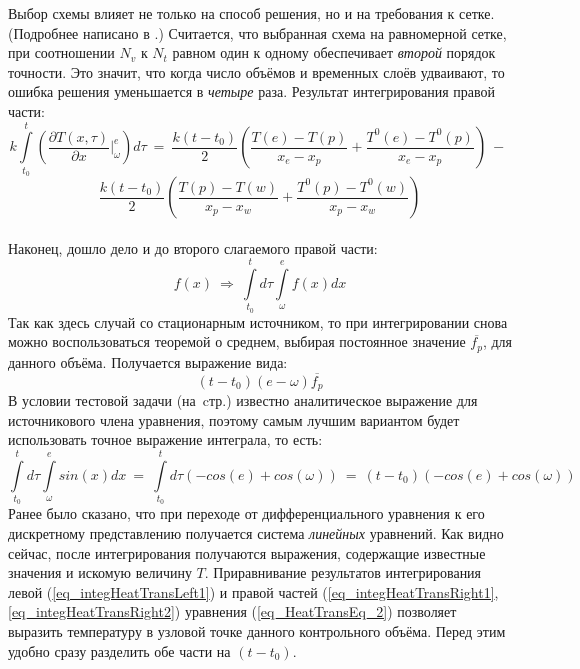 \documentclass[oneside, final, 14pt]{report}
\begin{document}
Выбор схемы влияет не только на способ решения, но и на требования к сетке. (Подробнее написано в \cite{bib:Patankar}.) Считается, что выбранная схема на равномерной сетке, при соотношении $N_v$ к $N_t$ равном один к одному обеспечивает \emph{второй} порядок точности. Это значит, что когда число объёмов и временных слоёв удваивают, то ошибка решения уменьшается в \emph{четыре} раза. Результат интегрирования правой части:
\[
k\int\limits_{t_0}^t \left( \frac{\partial T(x,\tau)}{\partial x}\bigg|_{\omega}^e\right) d\tau 
\ = \
\frac{k(t - t_0)}{2}\left( \frac{T(e)-T(p)}{x_e - x_p} + \frac{T^0(e)-T^0(p)}{x_e - x_p}\right)
\ - \ 
\]
\begin{equation}
\frac{k(t - t_0)}{2}\left( \frac{T(p)-T(w)}{x_p - x_{w}} + \frac{T^0(p)-T^0(w)}{x_p - x_{w}}\right)
\label{eq_integHeatTransRight1}
\end{equation} \\
Наконец, дошло дело и до второго слагаемого правой части:
\[f(x) \  \Rightarrow \ \int\limits_{t_0}^t d\tau \int\limits_{\omega}^e f(x)dx \]
Так как здесь случай со стационарным источником, то при интегрировании снова можно воспользоваться теоремой о среднем, выбирая постоянное значение $\overline{f_p}$, для данного объёма. Получается выражение вида: \\
\begin{equation}
(t - t_0)(e - \omega)\overline{f_p}
\label{eq_integHeatTransRight2}
\end{equation}
В условии тестовой задачи (на~cтр.\pageref{test_task_page}) известно аналитическое выражение для источникового члена уравнения, поэтому самым лучшим вариантом будет использовать точное выражение интеграла, то есть: \\
\begin{equation}
\int\limits_{t_0}^t d\tau \int\limits_{\omega}^e sin(x)dx 
\ = \ 
\int\limits_{t_0}^t d\tau \left( -cos(e) + cos(\omega) \right) 
\ = \
(t - t_0)\left( -cos(e) + cos(\omega) \right)
\end{equation}
Ранее было сказано, что при переходе от дифференциального уравнения к его дискретному представлению получается система \emph{линейных} уравнений. Как видно сейчас, после интегрирования получаются выражения, содержащие известные значения и искомую величину $T$. Приравнивание результатов интегрирования левой (\ref{eq_integHeatTransLeft1}) и правой частей (\ref{eq_integHeatTransRight1}, \ref{eq_integHeatTransRight2}) уравнения (\ref{eq_HeatTransEq_2}) позволяет выразить температуру в узловой точке данного контрольного объёма. Перед этим удобно сразу разделить обе части на $(t - t_0)$.
\end{document}
